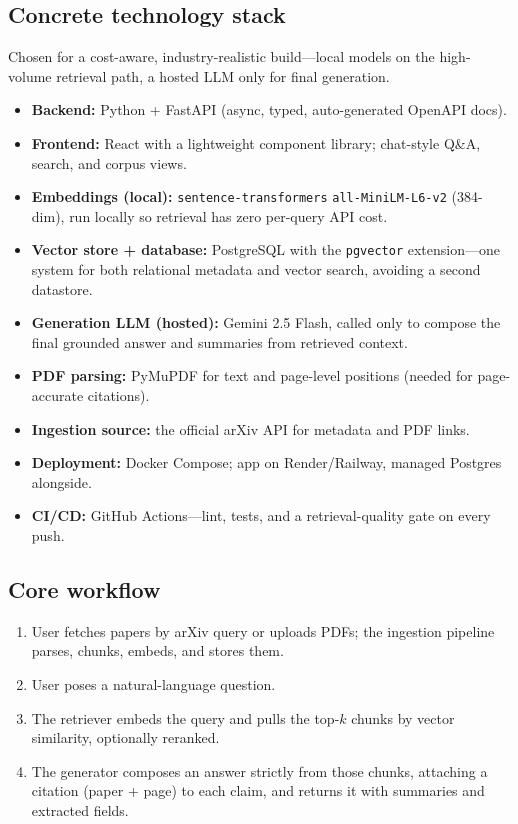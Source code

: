 \documentclass[11pt,a4paper]{article}
\begin{document}
\subsection{Concrete technology stack}
Chosen for a cost-aware, industry-realistic build---local models on the high-volume retrieval path, a hosted LLM only for final generation.
\begin{itemize}[leftmargin=0.7cm]
    \item \textbf{Backend:} Python + FastAPI (async, typed, auto-generated OpenAPI docs).
    \item \textbf{Frontend:} React with a lightweight component library; chat-style Q\&A, search, and corpus views.
    \item \textbf{Embeddings (local):} \texttt{sentence-transformers} \texttt{all-MiniLM-L6-v2} (384-dim), run locally so retrieval has zero per-query API cost.
    \item \textbf{Vector store + database:} PostgreSQL with the \texttt{pgvector} extension---one system for both relational metadata and vector search, avoiding a second datastore.
    \item \textbf{Generation LLM (hosted):} Gemini 2.5 Flash, called only to compose the final grounded answer and summaries from retrieved context.
    \item \textbf{PDF parsing:} PyMuPDF for text and page-level positions (needed for page-accurate citations).
    \item \textbf{Ingestion source:} the official arXiv API for metadata and PDF links.
    \item \textbf{Deployment:} Docker Compose; app on Render/Railway, managed Postgres alongside.
    \item \textbf{CI/CD:} GitHub Actions---lint, tests, and a retrieval-quality gate on every push.
\end{itemize}

\subsection{Core workflow}
\begin{enumerate}[leftmargin=0.7cm]
    \item User fetches papers by arXiv query or uploads PDFs; the ingestion pipeline parses, chunks, embeds, and stores them.
    \item User poses a natural-language question.
    \item The retriever embeds the query and pulls the top-$k$ chunks by vector similarity, optionally reranked.
    \item The generator composes an answer strictly from those chunks, attaching a citation (paper + page) to each claim, and returns it with summaries and extracted fields.
\end{enumerate}
\end{document}
